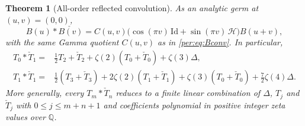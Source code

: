 \documentclass[11pt,letterpaper]{article}
\numberwithin{equation}{section}
\theoremstyle{plain}
\newtheorem{theorem}{Theorem}[section]
\theoremstyle{definition}
\theoremstyle{remark}
\begin{document}
\begin{theorem}[All-order reflected convolution]
\label{per:thm:reflectedgenerator}
As an analytic germ at $(u,v)=(0,0)$,
\begin{equation}\label{per:eq:Brefconv}
 B(u)*\check{B(v)}
 =C(u,v)\bigl(\cos(\pi v)\,\mathrm{Id}
                    +\sin(\pi v)\,\mathcal H\bigr)B(u+v),
\end{equation}
with the same Gamma quotient $C(u,v)$ as in \eqref{per:eq:Bconv}.
In particular,
\begin{align}
 T_0*\check T_1={}&\tfrac12T_2+\check T_2
                +\zeta(2)(T_0+\check T_0)+\zeta(3)\Delta,
 \label{per:eq:T0refT1}\\
 T_1*\check T_1={}&\tfrac12(T_3+\check T_3)
                +2\zeta(2)(T_1+\check T_1)
                +\zeta(3)(T_0+\check T_0)
                +\tfrac72\zeta(4)\Delta.
 \label{per:eq:T1refT1}
\end{align}
More generally, every $T_m*\check T_n$ reduces to a finite linear
combination of $\Delta$, $T_j$ and $\check T_j$ with
$0\le j\le m+n+1$ and coefficients polynomial in positive integer
zeta values over $\mathbb Q$.
\end{theorem}
\end{document}
